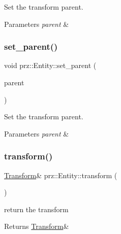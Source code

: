 Set the transform parent. 


\begin{DoxyParams}{Parameters}
{\em parent} & \\
\hline
\end{DoxyParams}
\mbox{\label{classprz_1_1_entity_ad9305e51dfcade9d1b7a6aa0e5d74b2e}} 
\subsubsection{\texorpdfstring{set\_parent()}{set\_parent()}\hspace{0.1cm}{\footnotesize\ttfamily [2/2]}}
{\footnotesize\ttfamily void prz\+::\+Entity\+::set\+\_\+parent (\begin{DoxyParamCaption}\item[{P\+S\+Ptr$<$ \mbox{\hyperlink{classprz_1_1_entity}{Entity}} $>$}]{parent }\end{DoxyParamCaption})\hspace{0.3cm}{\ttfamily [inline]}}



Set the transform parent. 


\begin{DoxyParams}{Parameters}
{\em parent} & \\
\hline
\end{DoxyParams}
\mbox{\label{classprz_1_1_entity_a4ad46e0479f2aa68a0ec75c8fe3b8238}} 
\subsubsection{\texorpdfstring{transform()}{transform()}}
{\footnotesize\ttfamily \mbox{\hyperlink{classprz_1_1_transform}{Transform}}\& prz\+::\+Entity\+::transform (\begin{DoxyParamCaption}{ }\end{DoxyParamCaption})\hspace{0.3cm}{\ttfamily [inline]}}



return the transform 

\begin{DoxyReturn}{Returns}
\mbox{\hyperlink{classprz_1_1_transform}{Transform}}\& 
\end{DoxyReturn}
\mbox{\label{classprz_1_1_entity_ac164eed5997d84d42014b6cb8fcc09c0}} 
